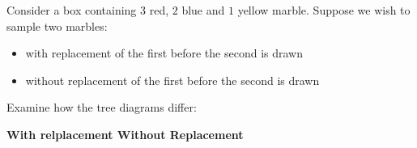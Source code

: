 \documentclass[11pt,a4paper]{book}
\begin{document}
Consider a box containing $3$ red, $2$ blue and $1$ yellow marble.
Suppose we wish to sample two marbles:

\begin{itemize}[leftmargin=4cm]

\item with replacement of the first before the second is drawn

\item without replacement of the first before the second is drawn

\end{itemize}

Examine how the tree diagrams differ:

\textbf{With relplacement \hspace{5.2cm}Without Replacement}
\end{document}

